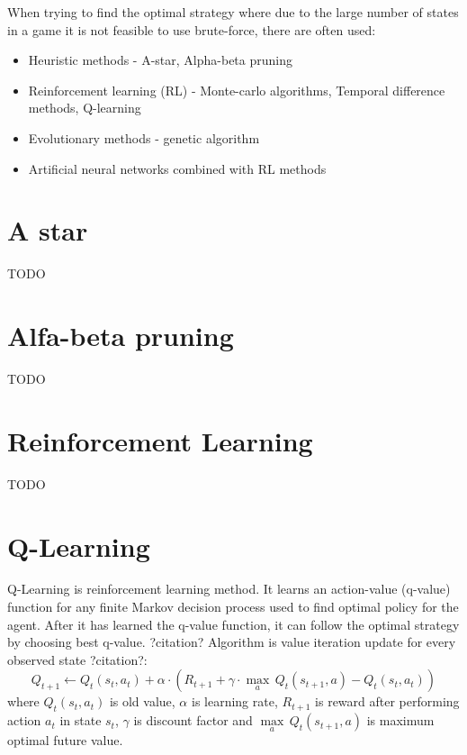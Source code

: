 When trying to find the optimal strategy where due to the large number
of states in a game it is not feasible to use brute-force, there are often
used:
\begin{itemize}
  \vspace*{-0.25cm}
  \setlength\itemsep{0cm}
  \item Heuristic methods - A-star, Alpha-beta pruning
  \item Reinforcement learning (RL) - Monte-carlo algorithms,
                                      Temporal difference methods, Q-learning
  \item Evolutionary methods - genetic algorithm
  \item Artificial neural networks combined with RL methods
  \vspace*{-0.15cm}
\end{itemize}

\section{A star}
TODO

\section{Alfa-beta pruning}
TODO

\section{Reinforcement Learning}
TODO

\section{Q-Learning}
Q-Learning is reinforcement learning method. It learns an action-value
(q-value) function for any finite Markov decision process used to find
optimal policy for the agent. After it has learned the q-value function,
it can follow the optimal strategy by choosing best q-value. ?citation?
Algorithm is value iteration update for every observed state ?citation?:
\begin{equation}
Q_{t+1} \leftarrow Q_t(s_t, a_t) + \alpha \cdot (
    R_{t+1} + \gamma\cdot {\max_a}\,Q_t(s_{t+1}, a) - Q_t(s_t, a_t)
)
\end{equation}
where $Q_t(s_t, a_t)$ is old value, $\alpha$ is learning rate, $R_{t+1}$ is
reward after performing action $a_t$ in state $s_t$, $\gamma$ is discount
factor and $\underset{a}{\max}\,Q_t(s_{t+1}, a)$ is maximum optimal future
value.

